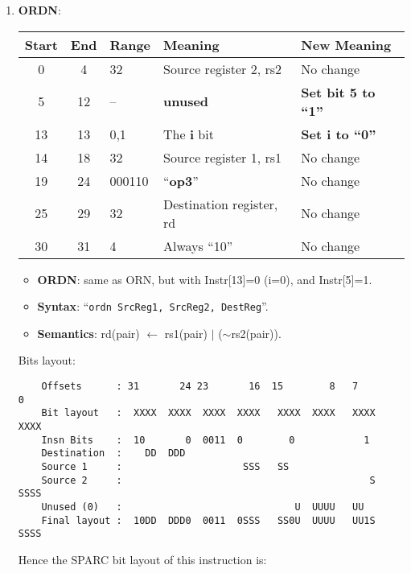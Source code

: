 \begin{enumerate}
\item \textbf{ORDN}:\\
  \begin{center}
    \begin{tabular}[p]{|c|c|l|l|l|}
      \hline
      \textbf{Start} & \textbf{End} & \textbf{Range} & \textbf{Meaning} &
                                                                          \textbf{New Meaning}\\
      \hline
      0 & 4 & 32 & Source register 2, rs2 & No change \\
      5 & 12 & -- & \textbf{unused} & \textbf{Set bit 5 to ``1''} \\
      13 & 13 & 0,1 & The \textbf{i} bit & \textbf{Set i to ``0''} \\
      14 & 18 & 32 & Source register 1, rs1 & No change \\
      19 & 24 & 000110 & ``\textbf{op3}'' & No change \\
      25 & 29 & 32 & Destination register, rd & No change \\
      30 & 31 & 4 & Always ``10'' & No change \\
      \hline
    \end{tabular}
  \end{center}
  \begin{itemize}
  \item []\textbf{ORDN}: same as ORN, but with Instr[13]=0 (i=0), and
    Instr[5]=1.
  \item []\textbf{Syntax}: ``\texttt{ordn  SrcReg1, SrcReg2, DestReg}''.
  \item []\textbf{Semantics}: rd(pair) $\leftarrow$ rs1(pair) $\vert$ ($\sim$rs2(pair)).
  \end{itemize}
  Bits layout:
\begin{verbatim}
    Offsets      : 31       24 23       16  15        8   7        0
    Bit layout   :  XXXX  XXXX  XXXX  XXXX   XXXX  XXXX   XXXX  XXXX
    Insn Bits    :  10       0  0011  0        0            1       
    Destination  :    DD  DDD                                       
    Source 1     :                     SSS   SS
    Source 2     :                                           S  SSSS
    Unused (0)   :                              U  UUUU   UU        
    Final layout :  10DD  DDD0  0011  0SSS   SS0U  UUUU   UU1S  SSSS
\end{verbatim}

  Hence the SPARC bit layout of this instruction is:


\end{enumerate}
